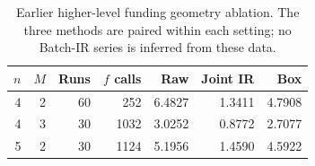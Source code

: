 \begin{table}[htbp]
\centering\small
\caption{Earlier higher-level funding geometry ablation. The three methods are paired within each setting; no Batch-IR series is inferred from these data.}\label{tab:restored-funding-geometry}
\begin{tabular}{rrrrrrr}
\toprule
$n$ & $M$ & Runs & $f$ calls & Raw & Joint IR & Box \\
\midrule
4 & 2 & 60 & 252 & 6.4827 & 1.3411 & 4.7908 \\
4 & 3 & 30 & 1032 & 3.0252 & 0.8772 & 2.7077 \\
5 & 2 & 30 & 1124 & 5.1956 & 1.4590 & 4.5922 \\
\bottomrule
\end{tabular}
\end{table}
